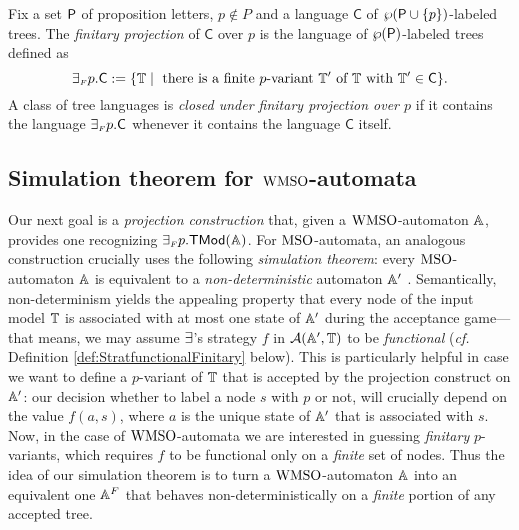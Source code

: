 \begin{definition}\label{def:tree_finproj}
Fix a set $\mathsf{P}$ of proposition letters, $p \not\in P$ and a language 
$\mathsf{C}$ of $\wp (\mathsf{P}\cup\{p\})$-labeled trees.
The \emph{finitary projection} of $\mathsf{C}$ over $p$ is the language of $\wp
(\mathsf{P})$-labeled trees defined as 
\[
{\finexists} p.\mathsf{C} \df \{\bbT \mid
\text{ there is a finite $p$-variant } \bbT' \text{ of } \bbT \text{ with }
\bbT' \in \mathsf{C}\}.
\]
%
A class of tree languages is \emph{closed under finitary projection over $p$} 
if it contains the language ${{\exists_{{\scriptscriptstyle F}}} p}.\mathsf{C}$ whenever it contains 
the language $\mathsf{C}$ itself.
\end{definition}

\subsection{Simulation theorem for $\mathrm{WMSO}$-automata}
\label{sec:simulationwmso}

\noindent
Our next goal is a \emph{projection construction} that, given a $\mathrm{WMSO}$-automaton
$\mathbb{A}$, provides one recognizing ${\exists_{{\scriptscriptstyle F}} p}.\mathsf{TMod}(\mathbb{A})$.
For $\mathrm{MSO}$-automata, an analogous construction crucially uses the following
\emph{simulation theorem}: every $\mathrm{MSO}$-automaton $\mathbb{A}$ is equivalent to a
\emph{non-deterministic} automaton $\mathbb{A}'$ \cite{Walukiewicz96}.
Semantically, non-determinism yields the appealing property that every node of
the input model $\mathbb{T}$ is associated with at most one state of $\mathbb{A}'$ during
the acceptance game--- that means, we may assume $\exists$'s strategy $f$ in
$\mathcal{A}(\mathbb{A}',\mathbb{T})$ to be \emph{functional} (\emph{cf.}
Definition \ref{def:StratfunctionalFinitary} below).
This is particularly helpful in case we want to define a $p$-variant of $\mathbb{T}$
that is accepted by the projection construct on $\mathbb{A}'$: our decision whether
to label a node $s$ with $p$ or not, will crucially depend on the value
$f(a,s)$, where $a$ is the unique state of $\mathbb{A}'$ that is associated with $s$.
Now, in the case of $\mathrm{WMSO}$-automata we are interested in guessing
\emph{finitary} $p$-variants, which requires $f$ to be functional only on a
\emph{finite} set of nodes.
Thus the idea of our simulation theorem is to turn a $\mathrm{WMSO}$-automaton $\mathbb{A}$
into an equivalent one $\mathbb{A}^{F}$ that behaves non-deterministically on a
\emph{finite} portion of any accepted tree.

